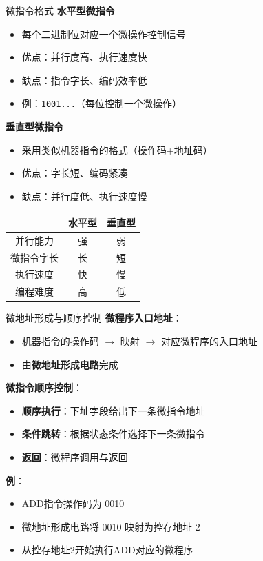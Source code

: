 \documentclass[10pt, aspectratio=169]{beamer}
\begin{document}
\begin{frame}{微指令格式}
    \textbf{水平型微指令}
    \begin{itemize}
        \item 每个二进制位对应一个微操作控制信号
        \item 优点：并行度高、执行速度快
        \item 缺点：指令字长、编码效率低
        \item 例：\texttt{1001...}（每位控制一个微操作）
    \end{itemize}
    \vspace{0.5em}
    \textbf{垂直型微指令}
    \begin{itemize}
        \item 采用类似机器指令的格式（操作码+地址码）
        \item 优点：字长短、编码紧凑
        \item 缺点：并行度低、执行速度慢
    \end{itemize}
    \vspace{0.5em}
    \begin{center}
        \begin{tabular}{|c|c|c|}
            \hline
            & 水平型 & 垂直型 \\
            \hline
            并行能力 & 强 & 弱 \\
            微指令字长 & 长 & 短 \\
            执行速度 & 快 & 慢 \\
            编程难度 & 高 & 低 \\
            \hline
        \end{tabular}
    \end{center}
\end{frame}

\begin{frame}[fragile]{微地址形成与顺序控制}
    \textbf{微程序入口地址}：
    \begin{itemize}
        \item 机器指令的操作码 $\rightarrow$ 映射 $\rightarrow$ 对应微程序的入口地址
        \item 由\textbf{微地址形成电路}完成
    \end{itemize}
    \vspace{0.3em}
    \textbf{微指令顺序控制}：
    \begin{itemize}
        \item \textbf{顺序执行}：下址字段给出下一条微指令地址
        \item \textbf{条件跳转}：根据状态条件选择下一条微指令
        \item \textbf{返回}：微程序调用与返回
    \end{itemize}
    \vspace{0.3em}
    \textbf{例}：
    \begin{itemize}
        \item ADD指令操作码为 0010
        \item 微地址形成电路将 0010 映射为控存地址 2
        \item 从控存地址2开始执行ADD对应的微程序
    \end{itemize}
\end{frame}
\end{document}
